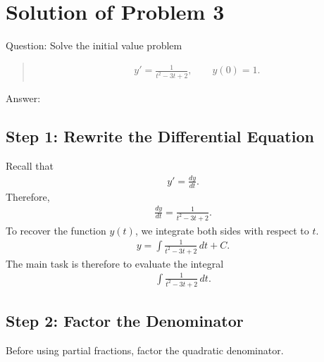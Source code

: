 \documentclass[letterpaper,10pt,english]{sphinxmanual}
\begin{document}
\section{Solution of Problem 3}
\label{\detokenize{Language/Science_language/ODE_calculus/course_MATH_3035/homework_assignments/index_pdf:solution-of-problem-3}}
\sphinxAtStartPar
Question: Solve the initial value problem
\begin{quote}
\begin{equation*}
\begin{split}y'=\frac{1}{t^2-3t+2},
\qquad
y(0)=1.\end{split}
\end{equation*}\end{quote}

\sphinxAtStartPar
Answer:


\subsection{Step 1: Rewrite the Differential Equation}
\label{\detokenize{Language/Science_language/ODE_calculus/course_MATH_3035/homework_assignments/index_pdf:step-1-rewrite-the-differential-equation}}
\sphinxAtStartPar
Recall that
\begin{equation*}
\begin{split}y'=\frac{dy}{dt}.\end{split}
\end{equation*}
\sphinxAtStartPar
Therefore,
\begin{equation*}
\begin{split}\frac{dy}{dt}=\frac{1}{t^2-3t+2}.\end{split}
\end{equation*}
\sphinxAtStartPar
To recover the function \(y(t)\), we integrate both sides with respect
to \(t\).
\begin{equation*}
\begin{split}y=\int \frac{1}{t^2-3t+2}\,dt + C.\end{split}
\end{equation*}
\sphinxAtStartPar
The main task is therefore to evaluate the integral
\begin{equation*}
\begin{split}\int \frac{1}{t^2-3t+2}\,dt.\end{split}
\end{equation*}

\subsection{Step 2: Factor the Denominator}
\label{\detokenize{Language/Science_language/ODE_calculus/course_MATH_3035/homework_assignments/index_pdf:step-2-factor-the-denominator}}
\sphinxAtStartPar
Before using partial fractions, factor the quadratic denominator.
\end{document}
